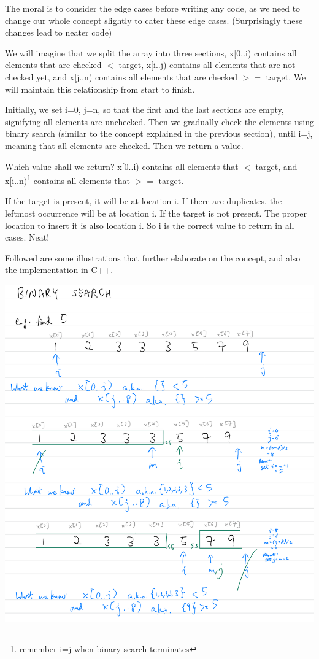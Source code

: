 
The moral is to consider the edge cases before writing any code, as we need to change our whole concept slightly to cater these edge cases. (Surprisingly these changes lead to neater code)


We will imagine that we split the array into three sections, x[0..i) contains all elements that are checked $<$ target, x[i..j) contains all elements that are not checked yet, and x[j..n) contains all elements that are checked $>=$ target. We will maintain this relationship from start to finish. 

Initially, we set i=0, j=n, so that the first and the last sections are empty, signifying all elements are unchecked. Then we gradually check the elements using binary search (similar to the concept explained in the previous section), until i=j, meaning that all elements are checked. Then we return a value.


Which value shall we return? x[0..i) contains all elements that $<$ target, and x[i..n)\footnote{remember i=j when binary search terminates} contains all elements that $>=$ target. 

If the target is present, it will be at location i. If there are duplicates, the leftmost occurrence will be at location i. If the target is not present. The proper location to insert it is also location i. So i is the correct value to return in all cases. Neat!


Followed are some illustrations that further elaborate on the concept, and also the implementation in C++.


\includegraphics[width=14cm]{images/ch7-binarysearch51.png}

